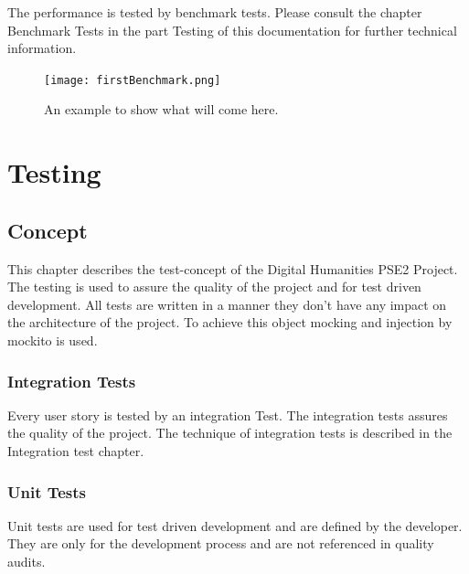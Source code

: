 \documentclass[11pt,fleqn,openany]{book} %
\begin{document}
The performance is tested by benchmark tests. Please consult the chapter Benchmark Tests in the part Testing of this documentation for further technical information.

\begin{figure}[h!]
  \caption{An example to show what will come here.}
  \centering
    \texttt{[image: firstBenchmark.png]}
\end{figure}



\part{Testing}



\chapter{Concept}
This chapter describes the test-concept of the Digital Humanities PSE2 Project. The testing is used to assure the quality of the project and for test driven development. All tests are written in a manner they don't have any impact on the architecture of the project. To achieve this object mocking and injection by mockito is used. 

\section*{Integration Tests}
Every user story is tested by an integration Test. The integration tests assures the quality of the project. The technique of integration tests is described in the Integration test chapter. 

\section*{Unit Tests}
Unit tests are used for test driven development and are defined by the developer. They are only for the development process and are not referenced in quality audits.

\newpage
\end{document}
